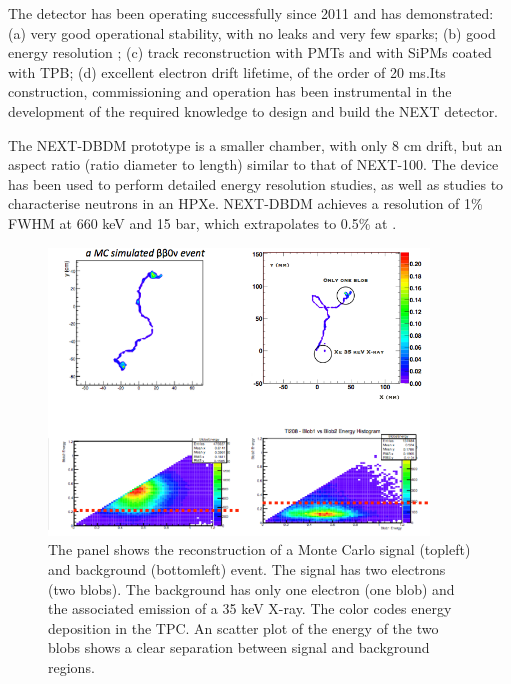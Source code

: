 \documentclass{PoS}
\begin{document}
The detector has been operating successfully since 2011 and has demonstrated: (a) very good operational stability, with no leaks and very few sparks; (b) good energy resolution ; (c) track reconstruction with PMTs and with SiPMs coated with TPB; (d) excellent electron drift lifetime, of the order of 20 ms.Its construction, commissioning and operation has been instrumental in the development of the required knowledge to design and build the NEXT detector.

The NEXT-DBDM prototype is a smaller chamber, with only 8 cm drift, but an aspect ratio (ratio diameter to length) similar to that of NEXT-100. The device has been used to perform detailed energy resolution studies, as well as studies to characterise neutrons in an HPXe. NEXT-DBDM achieves a resolution of 1\% FWHM at 660 keV and 15 bar, which extrapolates to 0.5\% at \Qbb.

\begin{figure}
\centering
\includegraphics[width=0.9\textwidth]{img/Topo2.png}
\caption{\small The panel shows the reconstruction of a Monte Carlo signal (topleft) and background (bottomleft) event. The signal has two electrons (two blobs). The background has only one electron (one blob) and the associated emission of a 35 keV X-ray. The color codes energy deposition in the TPC. An scatter plot of the energy of the two blobs shows a clear separation between signal and background regions.}\label{fig.ETRK2}
\end{figure}
\end{document}
